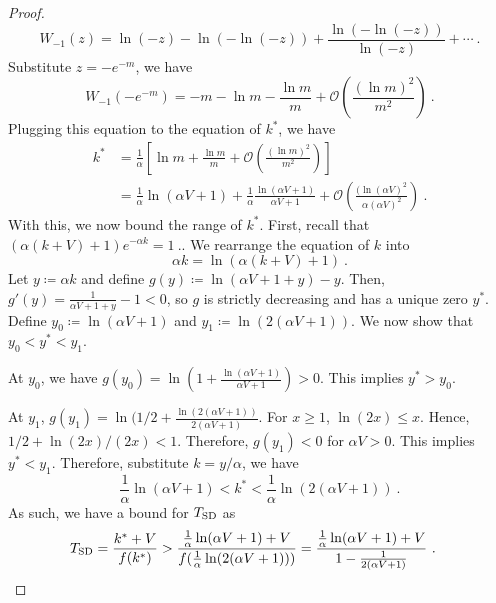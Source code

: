 \begin{proof}
    \begin{equation*}
        W_{-1}(z) = \ln(-z) - \ln(-\ln(-z)) + \frac{\ln(-\ln(-z))}{\ln(-z)} + \cdots\ .
    \end{equation*}
    Substitute $z=-e^{-m}$, we have
    \begin{equation*}
        W_{-1}(-e^{-m})=-m - \ln{m} - \frac{\ln{m}}{m} + \mathcal{O}\left(\frac{(\ln{m})^2}{m^2}\right)\ .
    \end{equation*}
    Plugging this equation to the equation of $k^*$, we have
    \begin{align*}
        k^*&=\frac{1}{\alpha}\left[ \ln{m} + \frac{\ln{m}}{m} + \mathcal{O}\left(\frac{(\ln{m})^2}{m^2} \right) \right] \\
         &= \frac{1}{\alpha}\ln(\alpha V + 1) + \frac{1}{\alpha} \frac{\ln(\alpha V + 1)}{\alpha V + 1} + \mathcal{O}\left( \frac{(\ln(\alpha V)^2}{\alpha (\alpha V)^2} \right)\ .
    \end{align*}
    With this, we now bound the range of $k^*$. First, recall that $(\alpha(k+V)+1)e^{-\alpha k} = 1\ .$. We rearrange the equation of $k$ into
    \begin{equation*}
        \alpha k = \ln(\alpha(k+V) + 1)\ .
    \end{equation*}
    Let $y \coloneqq \alpha k$ and define $g(y) \coloneqq \ln(\alpha V + 1 +  y) - y$. Then, $g'(y) = \frac{1}{\alpha V + 1 + y} - 1 < 0$, so $g$ is strictly decreasing and has a unique zero $y^*$. Define $y_0 \coloneqq \ln(\alpha V + 1)$ and $y_1 \coloneqq \ln(2(\alpha V + 1))$. We now show that $y_0 < y^* < y_1$.

    At $y_0$, we have $g(y_0) = \ln(1+\frac{\ln(\alpha V + 1)}{\alpha V + 1}) > 0$. This implies $y^* > y_0$.

    At $y_1$, $g(y_1) = \ln(1/2 + \frac{\ln(2(\alpha V+1))}{2(\alpha V + 1)}$. For $x \geq 1$, $\ln(2x) \leq x$. Hence, $1/2+\ln(2x)/(2x) < 1$. Therefore, $g(y_1) < 0$ for $\alpha V> 0$. This implies $y^* < y_1$. Therefore, substitute $k = y / \alpha$, we have
    \begin{equation*}
        \frac{1}{\alpha}\ln(\alpha V + 1) < k^* < \frac{1}{\alpha}\ln(2(\alpha V+ 1))\ .
    \end{equation*}
    As such, we have a bound for $T_{\textnormal{\text{SD}}}$ as
    \begin{align*}
        T_{\SD} &= \frac{k^*+V}{f(k^*)}    > \frac{\frac{1}{\alpha}\ln(\alpha V + 1) + V}{f(\frac{1}{\alpha} \ln(2(\alpha V + 1)))} =  \frac{\frac{1}{\alpha}\ln(\alpha V+1) + V}{1-\frac{1}{2(\alpha V+1)}}\ . \hfill \qedhere 
    \end{align*}
\end{proof}


